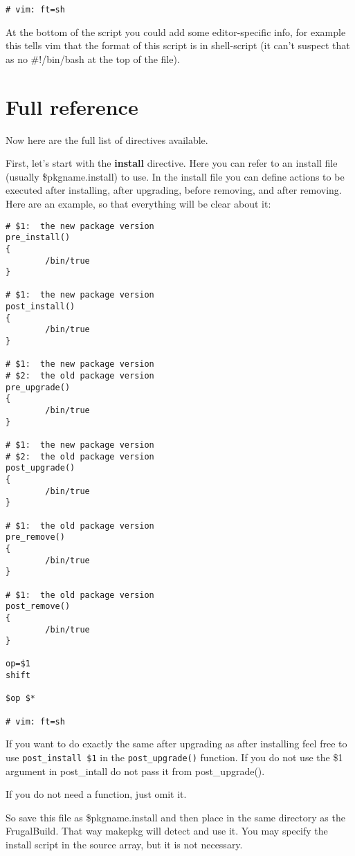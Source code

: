 \begin{verbatim}
# vim: ft=sh
\end{verbatim}

At the bottom of the script you could add some editor-specific info, for example this tells vim that the format of this script is in shell-script (it can't suspect that as no #!/bin/bash at the top of the file).

\section{Full reference}

Now here are the full list of directives available.

First, let's start with the \textbf{install} directive. Here you can refer to an install file (usually \$pkgname.install) to use. In the install file you can define actions to be executed after installing, after upgrading, before removing, and after removing. Here are an example, so that everything will be clear about it:

\begin{verbatim}
# $1:  the new package version
pre_install()
{
        /bin/true
}

# $1:  the new package version
post_install()
{
        /bin/true
}

# $1:  the new package version
# $2:  the old package version
pre_upgrade()
{
        /bin/true
}

# $1:  the new package version
# $2:  the old package version
post_upgrade()
{
        /bin/true
}

# $1:  the old package version
pre_remove()
{
        /bin/true
}

# $1:  the old package version
post_remove()
{
        /bin/true
}

op=$1
shift

$op $*

# vim: ft=sh
\end{verbatim}

If you want to do exactly the same after upgrading as after installing feel
free to use {\tt post\_install \$1} in the {\tt post\_upgrade()} function. If
you do not use the \$1 argument in post_intall do not pass it from
post\_upgrade().

If you do not need a function, just omit it.

So save this file as \$pkgname.install and then place in the same directory as
the FrugalBuild. That way makepkg will detect and use it.
You may specify the install script in the source array, but it is not
necessary.

